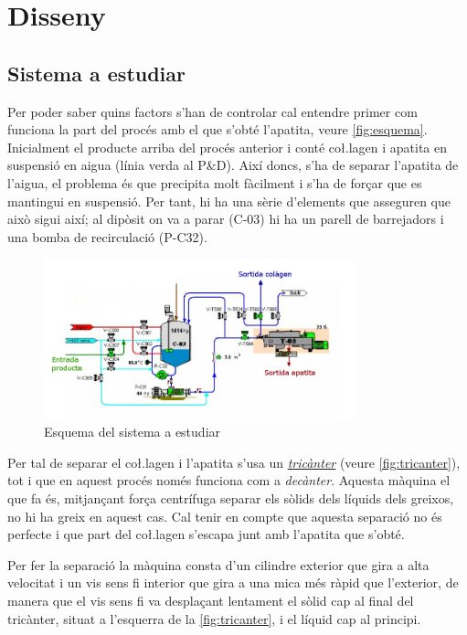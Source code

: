 \documentclass[a4paper]{article}
\begin{document}
\section{Disseny}

\subsection{Sistema a estudiar}
Per poder saber quins factors s'han de controlar cal entendre primer com funciona la part del procés amb el que s'obté l'apatita, veure \autoref{fig:esquema}. Inicialment el producte arriba del procés anterior i conté co\l.lagen i apatita en suspensió en aigua (línia verda al P\&D). Així doncs, s'ha de separar l'apatita de l'aigua, el problema és que precipita molt fàcilment i s'ha de forçar que es mantingui en suspensió. Per tant, hi ha una sèrie d'elements que asseguren que això sigui així; al dipòsit on va a parar (C-03) hi ha un parell de barrejadors i una bomba de recirculació (P-C32). 

\begin{figure}[H]
	\centering
	\includegraphics[width=0.8\textwidth]{images/esquema}
	\caption{Esquema del sistema a estudiar}
	\label{fig:esquema}
\end{figure}

Per tal de separar el co\l.lagen i l'apatita s'usa un \emph{\href{https://youtu.be/uvWcLZWM_JY}{tricànter}} (veure \autoref{fig:tricanter}), tot i que en aquest procés només funciona com a \emph{decànter}. Aquesta màquina el que fa és, mitjançant força centrífuga separar els sòlids dels líquids dels greixos, no hi ha greix en aquest cas. Cal tenir en compte que aquesta separació no és perfecte i que part del co\l.lagen s'escapa junt amb l'apatita que s'obté.

Per fer la separació la màquina consta d'un cilindre exterior que gira a alta velocitat i un vis sens fi interior que gira a una mica més ràpid que l'exterior, de manera que el vis sens fi va desplaçant lentament el sòlid cap al final del tricànter, situat a l'esquerra de la \autoref{fig:tricanter}, i el líquid cap al principi. 
\end{document}

